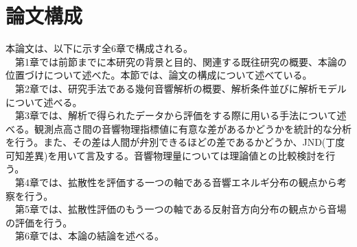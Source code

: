 \section{論文構成}
本論文は、以下に示す全6章で構成される。
\\　第1章では前節までに本研究の背景と目的、関連する既往研究の概要、本論の位置づけについて述べた。本節では、論文の構成について述べている。
\\　第2章では、研究手法である幾何音響解析の概要、解析条件並びに解析モデルについて述べる。
\\　第3章では、解析で得られたデータから評価をする際に用いる手法について述べる。観測点高さ間の音響物理指標値に有意な差があるかどうかを統計的な分析を行う。また、その差は人間が弁別できるほどの差であるかどうか、JND(丁度可知差異)を用いて言及する。音響物理量については理論値との比較検討を行う。
\\　第4章では、拡散性を評価する一つの軸である音響エネルギ分布の観点から考察を行う。
\\　第5章では、拡散性評価のもう一つの軸である反射音方向分布の観点から音場の評価を行う。
\\　第6章では、本論の結論を述べる。